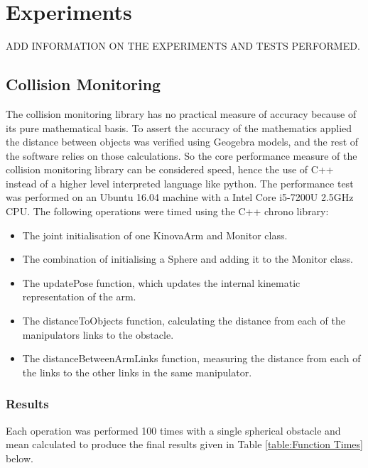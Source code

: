 \documentclass[a4paper, 11.5pt, conference]{ieeeconf}      %
\begin{document}
\section{Experiments}
ADD INFORMATION ON THE EXPERIMENTS AND TESTS PERFORMED.
\subsection{Collision Monitoring} %
The collision monitoring library has no practical measure of accuracy because of its pure mathematical basis. To assert the accuracy of the mathematics applied the distance between objects was verified using Geogebra models, and the rest of the software relies on those calculations. So the core performance measure of the collision monitoring library can be considered speed, hence the use of C++ instead of a higher level interpreted language like python. The performance test was performed on an Ubuntu 16.04 machine with a Intel Core i5-7200U 2.5GHz CPU. The following operations were timed using the C++ chrono library:
\begin{itemize}
	\item The joint initialisation of one KinovaArm and Monitor class.
	\item The combination of initialising a Sphere and adding it to the Monitor class.
	\item The updatePose function, which updates the internal kinematic representation of the arm.
	\item The distanceToObjects function, calculating the distance from each of the manipulators links to the obstacle.
	\item The distanceBetweenArmLinks function, measuring the distance from each of the links to the other links in the same manipulator.
\end{itemize}

\subsubsection{Results}
Each operation was performed 100 times with a single spherical obstacle and mean calculated to produce the final results given in Table \ref{table:Function Times} below.
\end{document}
